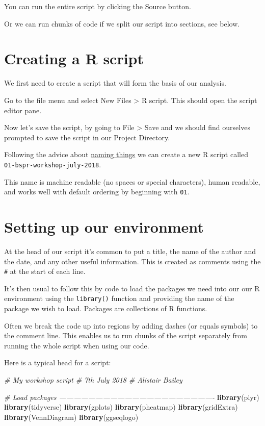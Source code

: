 \documentclass[12pt,]{book}
\newenvironment{Shaded}{\begin{snugshade}}{\end{snugshade}}
\newcommand{\CommentTok}[1]{\textcolor[rgb]{0.56,0.35,0.01}{\textit{#1}}}
\newcommand{\KeywordTok}[1]{\textcolor[rgb]{0.13,0.29,0.53}{\textbf{#1}}}
\newcommand{\NormalTok}[1]{#1}
\begin{document}
You can run the entire script by clicking the Source button.

Or we can run chunks of code if we split our script into sections, see below.

\hypertarget{creating-a-r-script}{%
\section{Creating a R script}\label{creating-a-r-script}}

We first need to create a script that will form the basis of our analysis.

Go to the file menu and select New Files \textgreater{} R script. This should open the script
editor pane.

Now let's save the script, by going to File \textgreater{} Save and we should find ourselves
prompted to save the script in our Project Directory.

Following the advice about \protect\hyperlink{names}{naming things} we can create a new R script
called \texttt{01-bspr-workshop-july-2018}.

This name is machine readable (no spaces or special characters), human readable,
and works well with default ordering by beginning with \texttt{01}.

\hypertarget{setting-up-our-environment}{%
\section{Setting up our environment}\label{setting-up-our-environment}}

At the head of our script it's common to put a title, the name of the author
and the date, and any other useful information. This is created as comments
using the \texttt{\#} at the start of each line.

It's then usual to follow this by code to load the packages we need into our
our R environment using the \texttt{library()} function and providing the name of the
package we wish to load. Packages are collections of R functions.

Often we break the code up into regions by adding dashes (or equals symbols)
to the comment line. This enables us to run chunks of the script separately from
running the whole script when using our code.

Here is a typical head for a script:

\begin{Shaded}
\begin{Highlighting}[]
\CommentTok{# My workshop script}
\CommentTok{# 7th July 2018}
\CommentTok{# Alistair Bailey}

\CommentTok{# Load packages ----------------------------------------------------------------}
\KeywordTok{library}\NormalTok{(plyr)}
\KeywordTok{library}\NormalTok{(tidyverse)}
\KeywordTok{library}\NormalTok{(gplots)}
\KeywordTok{library}\NormalTok{(pheatmap)}
\KeywordTok{library}\NormalTok{(gridExtra)}
\KeywordTok{library}\NormalTok{(VennDiagram)}
\KeywordTok{library}\NormalTok{(ggseqlogo)}
\end{Highlighting}
\end{Shaded}
\end{document}
